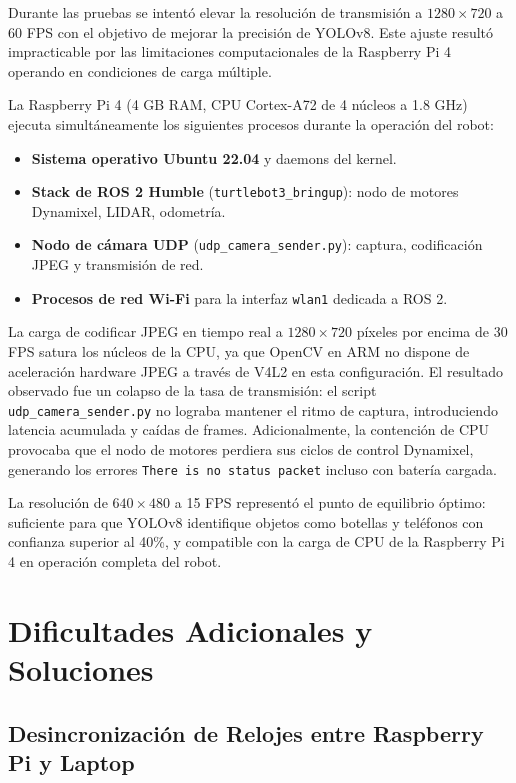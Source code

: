 \documentclass[12pt,a4paper]{article}
\begin{document}
Durante las pruebas se intent\'o elevar la resoluci\'on de transmisi\'on a $1280\times720$ a 60 FPS con el objetivo de mejorar la precisi\'on de YOLOv8. Este ajuste result\'o impracticable por las limitaciones computacionales de la Raspberry Pi 4 operando en condiciones de carga m\'ultiple.

La Raspberry Pi 4 (4 GB RAM, CPU Cortex-A72 de 4 n\'ucleos a 1.8 GHz) ejecuta simult\'aneamente los siguientes procesos durante la operaci\'on del robot:

\begin{itemize}
    \item \textbf{Sistema operativo Ubuntu 22.04} y daemons del kernel.
    \item \textbf{Stack de ROS 2 Humble} (\texttt{turtlebot3\_bringup}): nodo de motores Dynamixel, LIDAR, odometr\'ia.
    \item \textbf{Nodo de c\'amara UDP} (\texttt{udp\_camera\_sender.py}): captura, codificaci\'on JPEG y transmisi\'on de red.
    \item \textbf{Procesos de red Wi-Fi} para la interfaz \texttt{wlan1} dedicada a ROS 2.
\end{itemize}

La carga de codificar JPEG en tiempo real a $1280\times720$ píxeles por encima de 30 FPS satura los n\'ucleos de la CPU, ya que OpenCV en ARM no dispone de aceleraci\'on hardware JPEG a trav\'es de V4L2 en esta configuraci\'on. El resultado observado fue un colapso de la tasa de transmisi\'on: el script \texttt{udp\_camera\_sender.py} no lograba mantener el ritmo de captura, introduciendo latencia acumulada y caídas de frames. Adicionalmente, la contenci\'on de CPU provocaba que el nodo de motores perdiera sus ciclos de control Dynamixel, generando los errores \texttt{There is no status packet} incluso con bater\'ia cargada.

La resoluci\'on de $640\times480$ a 15 FPS represent\'o el punto de equilibrio \'optimo: suficiente para que YOLOv8 identifique objetos como botellas y tel\'efonos con confianza superior al 40\%, y compatible con la carga de CPU de la Raspberry Pi 4 en operaci\'on completa del robot.

\section{Dificultades Adicionales y Soluciones}

\subsection{Desincronizaci\'on de Relojes entre Raspberry Pi y Laptop}
\end{document}
